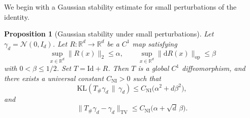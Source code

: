 \documentclass[11pt, reqno]{amsart}
\numberwithin{equation}{section}
\newtheorem{proposition}{Proposition}
\theoremstyle{remark}
\newcommand{\R}{\mathbb{R}}
\newcommand{\1}{\mathbf{1}}
\newcommand{\Id}{\mathrm{Id}}
\newcommand{\op}{\mathrm{op}}
\newcommand{\TV}{\mathrm{TV}}
\newcommand{\KL}{\mathrm{KL}}
\newcommand{\dd}{\mathrm{d}}
\begin{document}
We begin with a Gaussian stability estimate for small perturbations of the
identity.

\begin{proposition}[Gaussian stability under small perturbations]
\label{prop:near-identity}
Let $\gamma_d=\mathcal N(0,I_d)$. Let $R:\R^d\to\R^d$ be a $C^1$ map satisfying
\[
\sup_{x\in\R^d}\|R(x)\|_2\le \alpha,
\qquad
\sup_{x\in\R^d}\|\dd R(x)\|_{\op}\le \beta
\]
with $0<\beta\le 1/2$. Set $T=\Id+R$. Then $T$ is a global $C^1$
diffeomorphism, and there exists a universal constant $C_{\mathrm{NI}}>0$ such
that
\begin{equation}
\label{eq:near-identity-kl}
\KL(T_\#\gamma_d\,\|\,\gamma_d)
\le
C_{\mathrm{NI}}\bigl(\alpha^2+d\beta^2\bigr),
\end{equation}
and
\begin{equation}
\label{eq:near-identity-tv}
\|T_\#\gamma_d-\gamma_d\|_{\TV}
\le
C_{\mathrm{NI}}\bigl(\alpha+\sqrt d\,\beta\bigr).
\end{equation}
\end{proposition}
\end{document}
